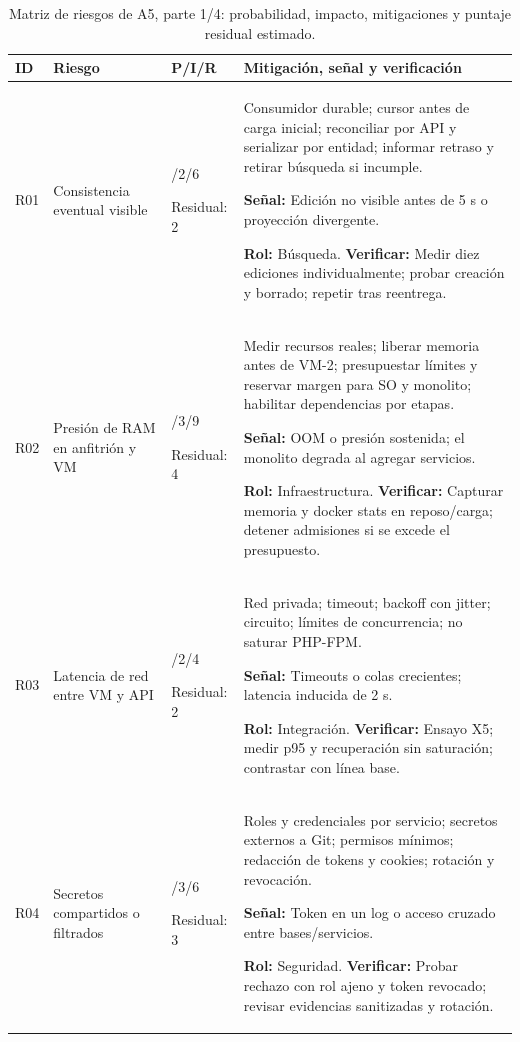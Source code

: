 \clearpage
\begin{table}[H]
\centering\small
\setlength{\tabcolsep}{4pt}
\renewcommand{\arraystretch}{1.10}
\caption{Matriz de riesgos de A5, parte 1/4: probabilidad, impacto, mitigaciones y puntaje residual estimado.}\label{tab:a5-riesgos}
\begin{tabularx}{\textwidth}{>{\raggedright\arraybackslash}p{0.75cm} >{\raggedright\arraybackslash}p{2.8cm} >{\raggedright\arraybackslash}p{1.8cm} >{\raggedright\arraybackslash}X}
\toprule
\textbf{ID} & \textbf{Riesgo} & \textbf{P/I/R} & \textbf{Mitigación, señal y verificación} \\
\midrule
R01 & Consistencia eventual visible & 3/2/6\par Residual: 2 & Consumidor durable; cursor antes de carga inicial; reconciliar por API y serializar por entidad; informar retraso y retirar búsqueda si incumple.\par\textbf{Señal:} Edición no visible antes de 5 s o proyección divergente.\par\textbf{Rol:} Búsqueda. \textbf{Verificar:} Medir diez ediciones individualmente; probar creación y borrado; repetir tras reentrega. \\[4pt]
R02 & Presión de RAM en anfitrión y VM & 3/3/9\par Residual: 4 & Medir recursos reales; liberar memoria antes de VM-2; presupuestar límites y reservar margen para SO y monolito; habilitar dependencias por etapas.\par\textbf{Señal:} OOM o presión sostenida; el monolito degrada al agregar servicios.\par\textbf{Rol:} Infraestructura. \textbf{Verificar:} Capturar memoria y docker stats en reposo/carga; detener admisiones si se excede el presupuesto. \\[4pt]
R03 & Latencia de red entre VM y API & 2/2/4\par Residual: 2 & Red privada; timeout; backoff con jitter; circuito; límites de concurrencia; no saturar PHP-FPM.\par\textbf{Señal:} Timeouts o colas crecientes; latencia inducida de 2 s.\par\textbf{Rol:} Integración. \textbf{Verificar:} Ensayo X5; medir p95 y recuperación sin saturación; contrastar con línea base. \\[4pt]
R04 & Secretos compartidos o filtrados & 2/3/6\par Residual: 3 & Roles y credenciales por servicio; secretos externos a Git; permisos mínimos; redacción de tokens y cookies; rotación y revocación.\par\textbf{Señal:} Token en un log o acceso cruzado entre bases/servicios.\par\textbf{Rol:} Seguridad. \textbf{Verificar:} Probar rechazo con rol ajeno y token revocado; revisar evidencias sanitizadas y rotación. \\[4pt]
\bottomrule
\end{tabularx}
\end{table}
